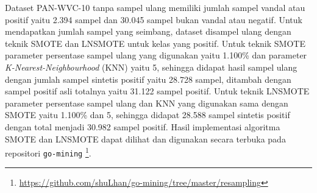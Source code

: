 Dataset PAN-WVC-10 tanpa sampel ulang memiliki jumlah sampel vandal atau
positif yaitu 2.394 sampel dan 30.045 sampel bukan vandal atau negatif.
Untuk mendapatkan jumlah sampel yang seimbang, dataset disampel ulang dengan
teknik SMOTE dan LNSMOTE untuk kelas yang positif.
Untuk teknik SMOTE parameter persentase sampel ulang yang digunakan yaitu
1.100\% dan parameter \textit{K-Nearest-Neighbourhood} (KNN) yaitu 5,
sehingga didapat hasil sampel ulang dengan jumlah sampel sintetis positif yaitu
28.728 sampel, ditambah dengan sampel positif asli totalnya yaitu 31.122 sampel
positif.
Untuk teknik LNSMOTE parameter persentase sampel ulang dan KNN yang digunakan
sama dengan SMOTE yaitu 1.100\% dan 5, sehingga didapat 28.588 sampel
sintetis positif dengan total menjadi 30.982 sampel positif.
Hasil implementasi algoritma SMOTE dan LNSMOTE dapat dilihat dan digunakan
secara terbuka pada repositori \texttt{go-mining}
\footnote{\url{https://github.com/shuLhan/go-mining/tree/master/resampling}}.
